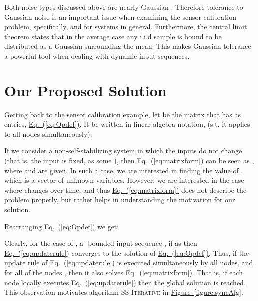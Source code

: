 \documentclass[preprint,12pt]{elsarticle}
\newcommand{\namedref}[2]{\hyperref[#2]{#1~\ref*{#2}}}
\newcommand{\figureref}[1]{\namedref{Figure}{#1}}
\newcommand{\namedrefeq}[2]{\hyperref[#2]{#1~\mbox{\rm(\ref*{#2})}}}
\newcommand{\equationref}[1]{\namedrefeq{Eq.}{#1}}
\newcommand{\syncAlg}{\textsc{SS-Iterative}\xspace}
\begin{document}
Both noise types discussed above are nearly Gaussian \cite{GIE}. Therefore tolerance to Gaussian noise is an important issue when examining the sensor calibration problem, specifically, and for systems in general. Furthermore, the central limit theorem states that in the average case any i.i.d sample is bound to be distributed as a Gaussian surrounding the mean. This makes Gaussian tolerance a powerful tool when dealing with dynamic input sequences.

\section{Our Proposed Solution}\label{sec:solution}
Getting back to the sensor calibration example, let  be the matrix that has  as entries,
\equationref{eq:Opdef}. It be written in linear algebra
notation, (s.t. it applies to all nodes simultaneously):


If we consider a non-self-stabilizing system in which the inputs
do not change (that is, the input is fixed, as some ), then
\equationref{eq:matrixform} can be seen as , where 
and  are given. In such a case, we are interested in finding
the value of , which is a vector of  unknown variables.
However, we are interested in the case where  changes over
time, and thus \equationref{eq:matrixform} does not describe the
problem properly, but rather helps in understanding the motivation
for our solution.

Rearranging \equationref{eq:Opdef} we get:


Clearly, for the case of , a -bounded input sequence
, if 
as  then \equationref{eq:updaterule}
converges to the solution of \equationref{eq:Opdef}. Thus, if the
update rule of \equationref{eq:updaterule} is executed
simultaneously by all nodes, and for all of the nodes
, then it also
solves \equationref{eq:matrixform}. That is, if each node locally
executes \equationref{eq:updaterule} then the global solution is
reached. This observation motivates algorithm \syncAlg in
\figureref{figure:syncAlg}.
\end{document}
